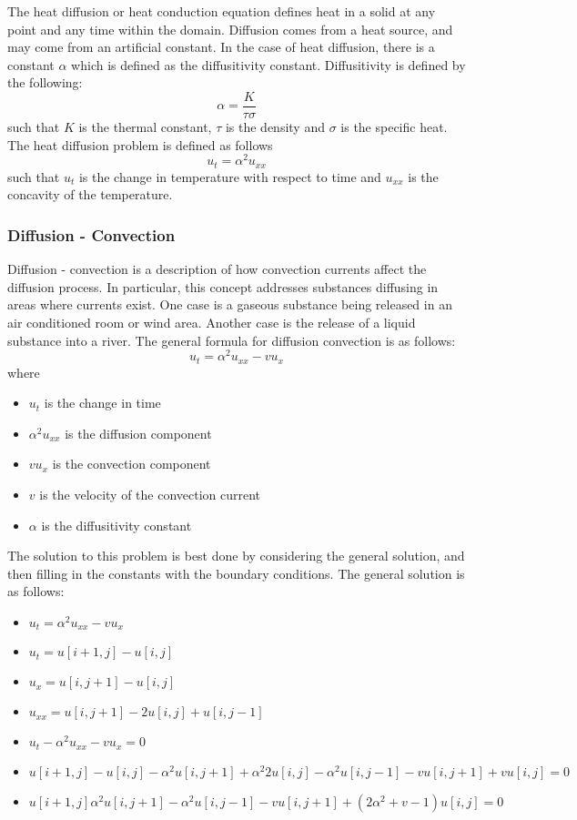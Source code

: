 The heat diffusion or heat conduction equation defines heat in a solid at any point and any time within the domain.  Diffusion comes from a heat source, and may come from an artificial constant.  In the case of heat diffusion, there is a constant $\alpha$ which is defined as the diffusitivity constant.  Diffusitivity is defined by the following:
\[\alpha = \frac{K}{\tau \sigma} \]
such that $K$ is the thermal constant, $\tau$ is the density and $\sigma$ is the specific heat.  The heat diffusion problem is defined as follows
\[
u_t = \alpha ^2 u_{xx} 
\]
such that $u_t$ is the change in temperature with respect to time and $u_{xx}$ is the concavity of the temperature.

\subsubsection {Diffusion - Convection }
Diffusion - convection is a description of how %
convection currents affect the diffusion process.  In particular, this concept addresses substances diffusing in areas where currents exist.  One case is a gaseous substance being released in an air conditioned room or wind area.  Another case is the release of a liquid substance into a river.  The general formula for diffusion convection is as follows:
\[ u_t = \alpha ^2 u_{xx} - vu_x \]  
where 
\begin{itemize}
\item %
$u_t $ is the change in time
\item $\alpha ^2 u_{xx} $ is the diffusion component
\item $vu_x$ is the convection component
\item $v$ is the velocity of the convection current
\item $\alpha$ is the diffusitivity constant
\end{itemize}


The solution to this problem is best done by considering the general solution, and then filling in the constants with the boundary conditions.  The general solution is as follows:

\begin{itemize}
\item $u_t = \alpha ^2 u_{xx} - vu_x $
\item $u_t  =  u[i+1,j] - u [i,j]$
\item $u_x = u[i,j+1] - u[i,j] $
\item $u_{xx} = u[i,j+1] - 2u[i,j] + u[i,j-1] $
\item $u_t - \alpha ^2 u_{xx} - vu_x = 0$
\item $ u[i+1,j] - u [i,j] -  \alpha ^2 u[i,j+1] + \alpha ^2 2u[i,j] - \alpha ^2 u[i,j-1] - v u[i,j+1] + v u[i,j] =0$
\item $ u[i+1,j]   \alpha ^2 u[i,j+1]  - \alpha ^2 u[i,j-1] - v u[i,j+1] + (2 \alpha ^2 +v - 1)  u[i,j] =0$ 
\end{itemize}


